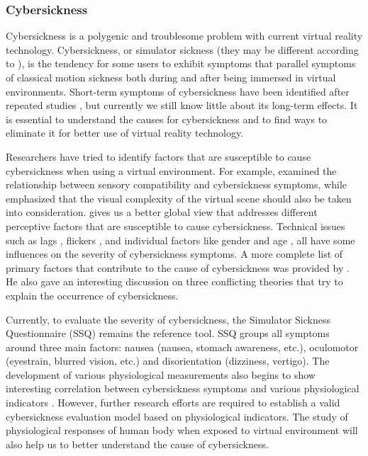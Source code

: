 \subsubsection{Cybersickness}
Cybersickness is a polygenic \citep{Kennedy1992Simulator} and troublesome problem with current virtual reality technology. Cybersickness, or simulator sickness (they may be different according to \citet{Stanney1997Cybersickness}), is the tendency for some users to exhibit symptoms that parallel symptoms of classical motion sickness both during and after being immersed in virtual environments. Short-term symptoms of cybersickness have been identified after repeated studies \citep{Lawson2002Signs}, but currently we still know little about its long-term effects. It is essential to understand the causes for cybersickness and to find ways to eliminate it for better use of virtual reality technology.

Researchers have tried to identify factors that are susceptible to cause cybersickness when using a virtual environment. For example, \citet{Rich1996AICS} examined the relationship between sensory compatibility and cybersickness symptoms, while \citet{So2002Scene} emphasized that the visual complexity of the virtual scene should also be taken into consideration. \citet{Stanney2002HPIVE} gives us a better global view that addresses different perceptive factors that are susceptible to cause cybersickness. Technical issues such as lags \citep{Pausch1992Literature}, flickers \citep{Harwood1987Temporal}, and individual factors like gender \citep{Biocca1992Will} and age \citep{Reason1975Motion}, all have some influences on the severity of cybersickness symptoms. A more complete list of primary factors that contribute to the cause of cybersickness was provided by \citet{LaViola2000DCV}. He also gave an interesting discussion on three conflicting theories that try to explain the occurrence of cybersickness.

Currently, to evaluate the severity of cybersickness, the Simulator Sickness Questionnaire (SSQ) \citep{Kennedy1993SSQ} remains the reference tool. SSQ groups all symptoms around three main factors: nausea (nausea, stomach awareness, etc.), oculomotor (eyestrain, blurred vision, etc.) and disorientation (dizziness, vertigo). The development of various physiological measurements also begins to show interesting correlation between cybersickness symptoms and various physiological indicators \citep{Kim2005Characteristic, Min2004Psycho, Sugita2008Quantitative}. However, further research efforts are required to establish a valid cybersickness evaluation model based on physiological indicators. The study of physiological responses of human body when exposed to virtual environment will also help us to better understand the cause of cybersickness.

